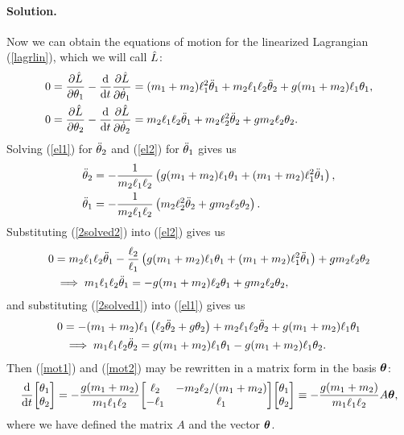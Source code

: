 \documentclass[11pt]{article}
\newcommand{\refeq}[1]{(\ref{#1})}
\newenvironment{solution}
{
    \paragraph{Solution.}
    \ignorespaces
}
{
    \bigskip
}
\begin{document}
\begin{solution}
	Now we can obtain the equations of motion for the linearized Lagrangian \refeq{lagrlin}, which we will call $\hat{L}$:
	\begin{align}
		0 &= \pdv{\hat{L}}{\theta_1} - \dv{}{t} \pdv{\hat{L}}{\dot{\theta}_1} = (m_1 + m_2) \ell_1^2 \ddot{\theta}_1 + m_2 \ell_1 \ell_2 \ddot{\theta}_2 + g (m_1 + m_2) \ell_1 \theta_1, \label{el1} \\
		0 &= \pdv{\hat{L}}{\theta_2} - \dv{}{t} \pdv{\hat{L}}{\dot{\theta}_2} = m_2 \ell_1 \ell_2 \ddot{\theta}_1 + m_2 \ell_2^2 \ddot{\theta}_2 + g m_2 \ell_2 \theta_2. \label{el2}
	\end{align}
	Solving \refeq{el1} for $\ddot{\theta}_2$ and \refeq{el2} for $\ddot{\theta}_1$ gives us
	\begin{align}
		\ddot{\theta}_2 &= -\frac{1}{m_2 \ell_1 \ell_2} \left( g (m_1 + m_2) \ell_1 \theta_1 + (m_1 + m_2) \ell_1^2 \ddot{\theta}_1 \right), \label{2solved2} \\
		\ddot{\theta}_1 &= -\frac{1}{m_2 \ell_1 \ell_2} \left( m_2 \ell_2^2 \ddot{\theta}_2 + g m_2 \ell_2 \theta_2 \right) \label{2solved1}.
	\end{align}
	Substituting \refeq{2solved2} into \refeq{el2} gives us
	\begin{align}
		0 &= m_2 \ell_1 \ell_2 \ddot{\theta}_1 - \frac{\ell_2}{\ell_1} \left( g (m_1 + m_2) \ell_1 \theta_1 + (m_1 + m_2) \ell_1^2 \ddot{\theta}_1 \right) + g m_2 \ell_2 \theta_2 \\
		&\implies m_1 \ell_1 \ell_2 \ddot{\theta}_1 = -g (m_1 + m_2) \ell_2 \theta_1 + g m_2 \ell_2 \theta_2, \label{mot1}
	\end{align}
	and substituting \refeq{2solved1} into \refeq{el1} gives us
	\begin{align}
		0 &= -(m_1 + m_2) \ell_1 \left( \ell_2 \ddot{\theta}_2 + g \theta_2 \right) + m_2 \ell_1 \ell_2 \ddot{\theta}_2 + g (m_1 + m_2) \ell_1 \theta_1 \\
		&\implies m_1 \ell_1 \ell_2 \ddot{\theta}_2 = g (m_1 + m_2) \ell_1 \theta_1 - g (m_1 + m_2) \ell_1 \theta_2. \label{mot2}
	\end{align}
	Then \refeq{mot1} and \refeq{mot2} may be rewritten in a matrix form in the basis $\boldsymbol{\theta}$:
	\begin{equation} \label{defa}
		\dv{}{t} \mqty[ \thq \\ \thw ] = -\frac{g (\mq + \mw)}{\mq \elq \elw} \mqty[ \elw & -\mw \elw / (\mq + \mw) \\ -\elq & \elq ] \mqty[ \thq \\ \thw ] \equiv -\frac{g (\mq + \mw)}{\mq \elq \elw} A \vth,
	\end{equation}
	where we have defined the matrix $A$ and the vector $\boldsymbol{\theta}$.
	

\end{solution}
\end{document}
